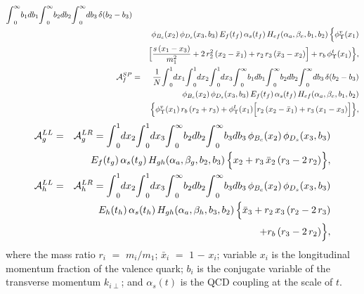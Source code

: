 \documentclass[preprint,superscriptaddress,nofootinbib]{revtex4}
\begin{document}
\begin{appendix}
\begin{eqnarray}
  {\int}_{0}^{\infty}b_{1} db_{1} {\int}_{0}^{\infty}b_{2} db_{2}
  {\int}_{0}^{\infty} db_{3}\, {\delta}(b_{2}-b_{3})
   \nonumber \\ & &
  {\phi}_{B_{c}}(x_{2})\, {\phi}_{D_{s}}(x_{3},b_{3})\,
  E_{f}(t_{f})\,{\alpha}_{s}(t_{f})\,
  H_{ef}({\alpha}_{a},{\beta}_{e},b_{1},b_{2})\,
   \Big\{ {\phi}_{\Upsilon}^{v}(x_{1})
   \nonumber \\ & &
   \Big[ \frac{s\,(x_{1}-x_{3})}{m_{1}^{2}}
   +2\,r_{2}^{2}\,(x_{2}-\bar{x}_{1})
   +r_{2}\,r_{3}\,(\bar{x}_{3}-x_{2}) \Big]
   +r_{b}\,{\phi}_{\Upsilon}^{t}(x_{1}) \Big\}
   \label{amp-figf-02}, \\
  {\cal A}_{f}^{SP} &=& \frac{1}{N}
  {\int}_{0}^{1}dx_{1} {\int}_{0}^{1}dx_{2} {\int}_{0}^{1}dx_{3}
  {\int}_{0}^{\infty}b_{1} db_{1} {\int}_{0}^{\infty}b_{2} db_{2}
  {\int}_{0}^{\infty} db_{3}\, {\delta}(b_{2}-b_{3})
   \nonumber \\ & &
  {\phi}_{B_{c}}(x_{2})\, {\phi}_{D_{s}}(x_{3},b_{3})\,
  E_{f}(t_{f})\,{\alpha}_{s}(t_{f})\,
  H_{ef}({\alpha}_{a},{\beta}_{e},b_{1},b_{2})
   \nonumber \\ & &
   \Big\{ {\phi}_{\Upsilon}^{v}(x_{1})\, r_{b}\,(r_{2}+r_{3})
   +{\phi}_{\Upsilon}^{t}(x_{1}) \Big[ r_{2}\,(x_{2}-\bar{x}_{1})
   +r_{3}\,(x_{1}-x_{3}) \Big] \Big\}
   \label{amp-figf-03},
   \end{eqnarray}
   \begin{eqnarray}
  {\cal A}_{g}^{LL} &=& {\cal A}_{g}^{LR} =
  {\int}_{0}^{1}dx_{2} {\int}_{0}^{1}dx_{3}
  {\int}_{0}^{\infty}b_{2} db_{2}
  {\int}_{0}^{\infty}b_{3} db_{3}\,
  {\phi}_{B_{c}}(x_{2})\, {\phi}_{D_{s}}(x_{3},b_{3})
   \nonumber \\ & &
  E_{f}(t_{g})\, {\alpha}_{s}(t_{g})\,
  H_{gh}({\alpha}_{a},{\beta}_{g},b_{2},b_{3})\,
   \Big\{ x_{2}+r_{3}\,\bar{x}_{2}\, (r_{3}-2\,r_{2}) \Big\}
   \label{amp-figg}, \\
  {\cal A}_{h}^{LL} &=& {\cal A}_{h}^{LR} =
  {\int}_{0}^{1}dx_{2} {\int}_{0}^{1}dx_{3}
  {\int}_{0}^{\infty}b_{2} db_{2}
  {\int}_{0}^{\infty}b_{3} db_{3}\,
  {\phi}_{B_{c}}(x_{2})\, {\phi}_{D_{s}}(x_{3},b_{3})
   \nonumber \\ & &
  E_{h}(t_{h})\, {\alpha}_{s}(t_{h})\,
  H_{gh}({\alpha}_{a},{\beta}_{h},b_{3},b_{2})\,
   \Big\{ \bar{x}_{3}+r_{2}\,x_{3}\, (r_{2}-2\,r_{3})
   \nonumber \\ & &
   +r_{b}\, (r_{3}-2\,r_{2}) \Big\}
   \label{amp-figh},
   \end{eqnarray}
  where the mass ratio $r_{i}$ $=$ $m_{i}/m_{1}$;
  $\bar{x}_{i}$ $=$ $1$ $-$ $x_{i}$;
  variable $x_{i}$ is the longitudinal momentum fraction
  of the valence quark;
  $b_{i}$ is the conjugate variable of the
  transverse momentum $k_{i{\perp}}$;
  and ${\alpha}_{s}(t)$ is the QCD coupling at the
  scale of $t$.


\end{appendix}
\end{document}
